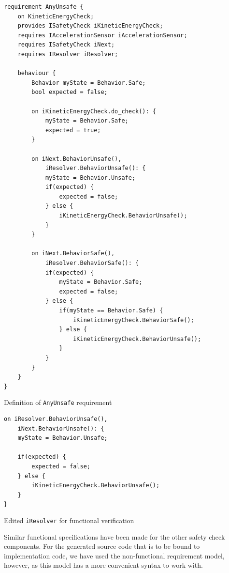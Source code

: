 \documentclass[12pt]{scrreprt}
\begin{document}
\begin{listing}
\begin{verbatim}
requirement AnyUnsafe {
	on KineticEnergyCheck;
	provides ISafetyCheck iKineticEnergyCheck;
	requires IAccelerationSensor iAccelerationSensor;
	requires ISafetyCheck iNext;
	requires IResolver iResolver;

    behaviour {
        Behavior myState = Behavior.Safe;
        bool expected = false;

        on iKineticEnergyCheck.do_check(): {
            myState = Behavior.Safe;
            expected = true;
        }

        on iNext.BehaviorUnsafe(),
            iResolver.BehaviorUnsafe(): {
            myState = Behavior.Unsafe;
            if(expected) {
                expected = false;
            } else {
                iKineticEnergyCheck.BehaviorUnsafe();
            }
        }

        on iNext.BehaviorSafe(),
            iResolver.BehaviorSafe(): {
            if(expected) {
                myState = Behavior.Safe;
                expected = false;
            } else {
                if(myState == Behavior.Safe) {
                    iKineticEnergyCheck.BehaviorSafe();
                } else {
                    iKineticEnergyCheck.BehaviorUnsafe();
                }
            }
        }
    }
}
\end{verbatim} 
\label{mfunctional_requirement}
\caption{Definition of \texttt{AnyUnsafe} requirement}
\end{listing}

\begin{listing}
\begin{verbatim}
on iResolver.BehaviorUnsafe(),
	iNext.BehaviorUnsafe(): {
	myState = Behavior.Unsafe;

	if(expected) {
	    expected = false;
	} else {
    	iKineticEnergyCheck.BehaviorUnsafe();
	}
}

\end{verbatim}

\label{modified_ke}
\caption{Edited \texttt{iResolver} for  functional verification}
\end{listing}

Similar functional specifications have been made for the other safety check components. For the generated source code that is to be bound to implementation code, we have used the non-functional requirement model, however, as this model has a more convenient syntax to work with.
\end{document}
